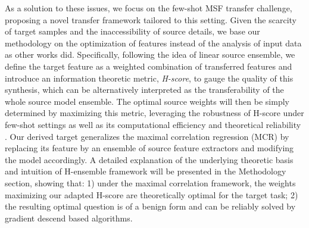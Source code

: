 \documentclass[letterpaper]{article} %
\begin{document}
As a solution to these issues, we focus on the few-shot MSF transfer challenge, proposing a novel transfer framework tailored to this setting.
Given the scarcity of target samples and the inaccessibility of source details, we base our methodology on the optimization of features instead of the analysis of input data as other works did.
Specifically, following the idea of linear source ensemble, we define the target feature as a weighted combination of transferred features and introduce an information theoretic metric, \textit{H-score}, to gauge the quality of this synthesis, which can be alternatively interpreted as the transferability of the whole source model ensemble. The optimal source weights will then be simply determined by maximizing this metric, leveraging the robustness of H-score under few-shot settings as well as its computational efficiency and theoretical reliability \citep{huang2019information}.
Our derived target generalizes the maximal correlation regression (MCR) by replacing its feature by an ensemble of source feature extractors and modifying the model accordingly.
A detailed explanation of the underlying theoretic basis and intuition of H-ensemble framework will be presented in the Methodology section, showing that: 1) under the maximal correlation framework, the weights maximizing our adapted H-score are theoretically optimal for the target task; 2) the resulting optimal question is of a benign form and can be reliably solved by gradient descend based algorithms.

\end{document}
